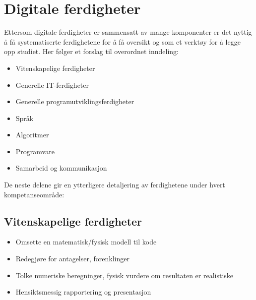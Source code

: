\section{Digitale ferdigheter}

Ettersom digitale ferdigheter er sammensatt av mange komponenter er det nyttig å få systematiserte ferdighetene for å få oversikt og som et verktøy for å legge opp studiet. Her følger et forslag til overordnet inndeling:

\begin{itemize}
	\item Vitenskapelige ferdigheter
	\item Generelle IT-ferdigheter
	\item Generelle programutviklingsferdigheter
	\item Språk
	\item Algoritmer
	\item Programvare
	\item Samarbeid og kommunikasjon
\end{itemize}

De neste delene gir en ytterligere detaljering av ferdighetene under hvert kompetanseområde:

\subsection{Vitenskapelige ferdigheter}
\begin{itemize}
	\item Omsette en matematisk/fysisk modell til kode
	\item Redegjøre for antagelser, forenklinger
	\item Tolke numeriske beregninger, fysisk vurdere om resultaten er realistiske
	\item Hensiktsmessig rapportering og presentasjon
\end{itemize}

